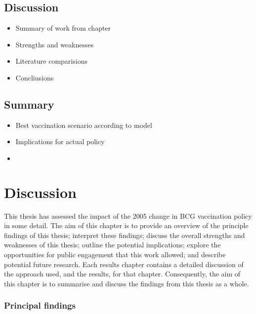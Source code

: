 \documentclass[11pt,twoside]{bristolthesis}
\providecommand{\tightlist}{%
  \setlength{\itemsep}{0pt}\setlength{\parskip}{0pt}}
\begin{document}
  \hypertarget{discussion-6}{%
  \section{Discussion}\label{discussion-6}}
  \begin{itemize}
  \tightlist
  \item
    Summary of work from chapter
  \item
    Strengths and weaknesses
  \item
    Literature comparisions
  \item
    Concliusions
  \end{itemize}
  \hypertarget{summary-9}{%
  \section{Summary}\label{summary-9}}
  \begin{itemize}
  \item
    Best vaccination scenario according to model
  \item
    Implications for actual policy
  \item
  \end{itemize}
  \hypertarget{discussion-chapt}{%
  \chapter{Discussion}\label{discussion-chapt}}
  
  This thesis has assessed the impact of the 2005 change in BCG vaccination policy in some detail. The aim of this chapter is to provide an overview of the principle findings of this thesis; interpret these findings; discuss the overall strengths and weaknesses of this thesis; outline the potential implications; explore the opportunities for public engagement that this work allowed; and describe potential future research. Each results chapter contains a detailed discussion of the approach used, and the results, for that chapter. Consequently, the aim of this chapter is to summarise and discuss the findings from this thesis as a whole.
  
  \hypertarget{principal-findings}{%
  \subsection{Principal findings}\label{principal-findings}}
  
\end{document}
